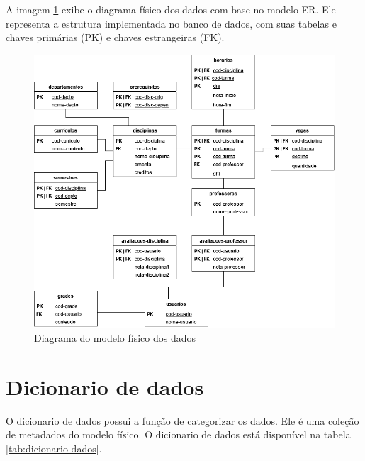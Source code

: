A imagem \ref{fig:modelo-fisico} exibe o diagrama físico dos dados com base no modelo ER. Ele representa a estrutura implementada no banco de dados, com suas tabelas e chaves primárias (PK) e chaves estrangeiras (FK).

\begin{figure}[ht]
    \begin{center}
    \includegraphics[width=390pt]{figuras/modelo-fisico.png}
    \caption{Diagrama do modelo físico dos dados}
    \label{fig:modelo-fisico}
    \end{center}
\end{figure}

\section{Dicionario de dados}

O dicionario de dados possui a função de categorizar os dados. Ele é uma coleção de metadados do modelo físico. O dicionario de dados está disponível na tabela \ref{tab:dicionario-dados}.

